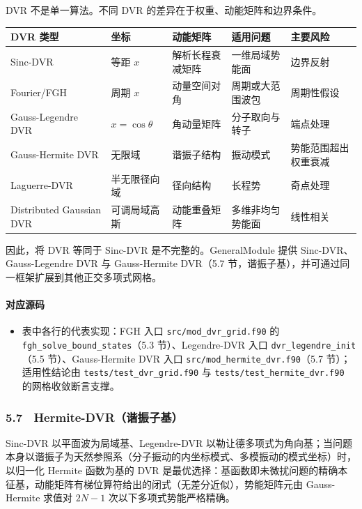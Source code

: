 \documentclass[
]{ctexbook}
\providecommand{\tightlist}{%
  \setlength{\itemsep}{0pt}\setlength{\parskip}{0pt}}
\begin{document}
DVR 不是单一算法。不同 DVR 的差异在于权重、动能矩阵和边界条件。

\begin{longtable}[]{@{}lllll@{}}
\toprule
DVR 类型 & 坐标 & 动能矩阵 & 适用问题 & 主要风险\tabularnewline
\midrule
\endhead
Sinc-DVR & 等距 \(x\) & 解析长程衰减矩阵 & 一维局域势能面 &
边界反射\tabularnewline
Fourier/FGH & 周期 \(x\) & 动量空间对角 & 周期或大范围波包 &
周期性假设\tabularnewline
Gauss-Legendre DVR & \(x=\cos\theta\) & 角动量矩阵 & 分子取向与转子 &
端点处理\tabularnewline
Gauss-Hermite DVR & 无限域 & 谐振子结构 & 振动模式 &
势能范围超出权重衰减\tabularnewline
Laguerre-DVR & 半无限径向域 & 径向结构 & 长程势 &
奇点处理\tabularnewline
Distributed Gaussian DVR & 可调局域高斯 & 动能重叠矩阵 &
多维非均匀势能面 & 线性相关\tabularnewline
\bottomrule
\end{longtable}

因此，将 DVR 等同于 Sinc-DVR 是不完整的。GeneralModule 提供
Sinc-DVR、Gauss-Legendre DVR 与 Gauss-Hermite DVR（5.7
节，谐振子基），并可通过同一框架扩展到其他正交多项式网格。

\hypertarget{ux5bf9ux5e94ux6e90ux7801-9}{%
\paragraph{对应源码}\label{ux5bf9ux5e94ux6e90ux7801-9}}

\begin{itemize}
\tightlist
\item
  表中各行的代表实现：FGH 入口 \texttt{src/mod\_dvr\_grid.f90} 的
  \texttt{fgh\_solve\_bound\_states}（5.3 节）、Legendre-DVR 入口
  \texttt{dvr\_legendre\_init}（5.5 节）、Gauss-Hermite DVR 入口
  \texttt{src/mod\_hermite\_dvr.f90}（5.7 节）；适用性结论由
  \texttt{tests/test\_dvr\_grid.f90} 与
  \texttt{tests/test\_hermite\_dvr.f90} 的网格收敛断言支撑。
\end{itemize}

\hypertarget{hermite-dvrux8c10ux632fux5b50ux57fa}{%
\subsubsection{5.7　Hermite-DVR（谐振子基）}\label{hermite-dvrux8c10ux632fux5b50ux57fa}}

Sinc-DVR 以平面波为局域基、Legendre-DVR
以勒让德多项式为角向基；当问题本身以谐振子为天然参照系（分子振动的内坐标模式、多模振动的模式坐标）时，以归一化
Hermite 函数为基的 DVR
是最优选择：基函数即未微扰问题的精确本征基，动能矩阵有梯位算符给出的闭式（无差分近似），势能矩阵元由
Gauss-Hermite 求值对 \(2N-1\) 次以下多项式势能严格精确。
\end{document}
